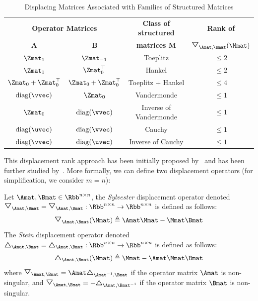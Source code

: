 \begin{table}[ht]
  \centering
  \begin{tabular}{c|c|c|c}
    \toprule
    \multicolumn{2}{c|}{\textbf{Operator Matrices}} & \textbf{Class of structured} & \textbf{Rank of } \\
    \textbf{A} & \textbf{B} & \textbf{matrices M} & $\triangleopdown_{\Amat, \Bmat}(\Mmat)$ \\
    \midrule
    $\Zmat_1$                & $\Zmat_{-1}$             & Toeplitz               & $\leq 2$ \\
    $\Zmat_1$                & $\Zmat_0^\top$           & Hankel                 & $\leq 2$ \\
    $\Zmat_0 + \Zmat_0^\top$ & $\Zmat_0 + \Zmat_0^\top$ & Toeplitz + Hankel      & $\leq 4$ \\
    $\diag(\vvec)$           & $\Zmat_0$                & Vandermonde            & $\leq 1$ \\
    $\Zmat_0$                & $\diag(\vvec)$           & Inverse of Vandermonde & $\leq 1$ \\
    $\diag(\uvec)$           & $\diag(\vvec)$           & Cauchy                 & $\leq 1$ \\
    $\diag(\vvec)$           & $\diag(\uvec)$           & Inverse of Cauchy      & $\leq 1$ \\
    \bottomrule
  \end{tabular}
  \caption{Displacing Matrices Associated with Families of Structured Matrices \cite{pan2001structured}}
  \label{table:ch2-displacing_matrices}
\end{table}

This displacement rank approach has been initially proposed by~\citet{kailath1979displacement} and has been further studied by~\citet{kailath1995displacement,pan2001structured}.
More formally, we can define two displacement operators (for simplification, we consider $m = n$):
\begin{definition}
  Let $\Amat, \Bmat \in \Rbb^{n \times n}$, the \emph{Sylvester} displacement operator denoted $\triangleopdown_{\Amat, \Bmat} = \triangleopdown_{\Amat, \Bmat}: \Rbb^{n \times n} \rightarrow \Rbb^{n \times n}$ is defined as follows:
  \begin{equation}
    \triangleopdown_{\Amat, \Bmat} (\Mmat) \triangleq \Amat \Mmat - \Mmat \Bmat
  \end{equation}
  The \emph{Stein} displacement operator denoted $\triangleopup_{\Amat, \Bmat} = \triangleopup_{\Amat, \Bmat}: \Rbb^{n \times n} \rightarrow \Rbb^{n \times n}$ is defined as follows:
  \begin{equation}
    \triangleopup_{\Amat, \Bmat} (\Mmat) \triangleq \Mmat - \Amat \Mmat \Bmat
  \end{equation}
  where $\triangleopdown_{\Amat, \Bmat} = \Amat \triangleopup_{\Amat^{-1}, \Bmat}$ if the operator matrix $\Amat$ is non-singular, and $\triangleopdown_{\Amat, \Bmat} = -\triangleopup_{\Amat, \Bmat^{-1}}$ if the operator matrix $\Bmat$ is non-singular.
\end{definition}



